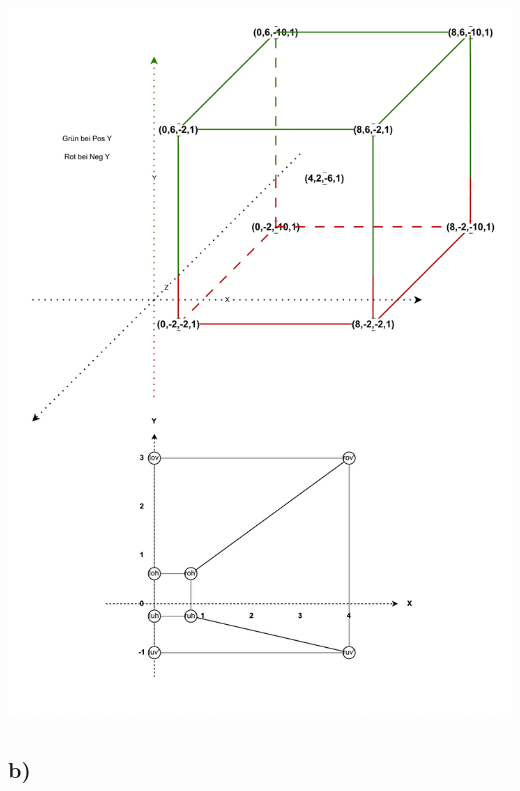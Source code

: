 \documentclass{article}
\begin{document}
\includegraphics[width=1.2\textwidth,keepaspectratio]{CG_Blatt2_bild_und_drawio.pdf}

\subsection*{b)}
\end{document}
